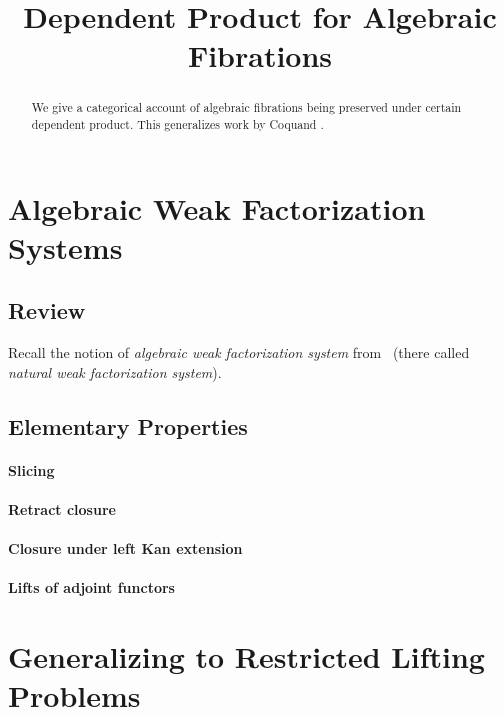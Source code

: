 \documentclass[reqno,10pt,a4paper,oneside]{amsart}
\title{Dependent Product for Algebraic Fibrations}
\begin{document}
\begin{abstract}
We give a categorical account of algebraic fibrations being preserved under certain dependent product.
This generalizes work by Coquand \etal.
\end{abstract}

\maketitle

\tableofcontents

\section{Algebraic Weak Factorization Systems}

\subsection{Review}

Recall the notion of \emph{algebraic weak factorization system} from~\cite{garner:small-object-argument} (there called \emph{natural weak factorization system}).

\subsection{Elementary Properties}

\paragraph{Slicing}

\paragraph{Retract closure}

\paragraph{Closure under left Kan extension}

\paragraph{Lifts of adjoint functors}

\section{Generalizing to Restricted Lifting Problems}
\end{document}
